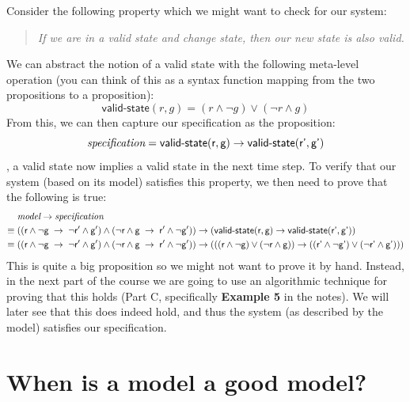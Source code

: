 Consider the following property which we might want to check
for our system:
%
\begin{quote}
\emph{If we are in a valid state and change state, then our new state
  is also valid.}
\end{quote}
%
We can abstract the notion of a valid state with the following
meta-level operation (you can think of this as a syntax function mapping from the
two propositions to a proposition):
%
\begin{equation*}
\textsf{valid-state}(r, g) = (r \wedge \neg g) \vee (\neg r \wedge g)
\end{equation*}
%
From this, we can then capture our specification as the proposition:
%
\begin{equation*}
  \textit{specification} = \textsf{valid-state}(\textsf{r}, \textsf{g})
  \rightarrow \textsf{valid-state}(\textsf{r'}, \textsf{g'})
\end{equation*}
%
\ie{}, a valid state now implies a valid state in the next time step.
To verify that our system (based on its model) satisfies this
property, we then need to prove that the following is true:
%
\begin{align*}
 & \textit{model} \rightarrow \textit{specification} \\
  \equiv \; &
((\textsf{r}{} \wedge \neg\textsf{g}{} \; \rightarrow \; \neg\textsf{r}{}' \wedge
\textsf{g}{}')
\wedge
(\neg\textsf{r}{} \wedge \textsf{g}{} \; \rightarrow \; \textsf{r}{}' \wedge
  \neg\textsf{g}{}'))
  \rightarrow
   (\textsf{valid-state}(\textsf{r}, \textsf{g})
           \rightarrow \textsf{valid-state}(\textsf{r'}, \textsf{g'})) \\
  \equiv \; &
((\textsf{r}{} \wedge \neg\textsf{g}{} \; \rightarrow \; \neg\textsf{r}{}' \wedge
\textsf{g}{}')
\wedge
(\neg\textsf{r}{} \wedge \textsf{g}{} \; \rightarrow \; \textsf{r}{}' \wedge
  \neg\textsf{g}{}'))
              \rightarrow
              (((\textsf{r} \wedge \neg \textsf{g}) \vee (\neg \textsf{r} \wedge \textsf{g}))
              \rightarrow ((\textsf{r'} \wedge \neg \textsf{g'}) \vee (\neg \textsf{r'} \wedge \textsf{g'})))
\end{align*}
%
This is quite a big proposition so we might not want to prove it by
hand. Instead, in the next part of the course we are going to use an
algorithmic technique for proving that this holds (Part C,
specifically \textbf{Example 5} in the notes). We will later see that
this does indeed hold, and thus the system (as described by the model)
satisfies our specification.


\section{When is a model a good model?}
\label{subsec:whenisamodelgood}

